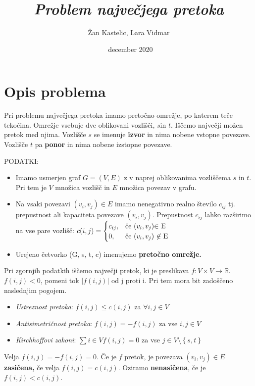 \documentclass[a4paper]{article}
\title{\textit{Problem največjega pretoka}}
\author{Žan Kastelic, Lara Vidmar}
\date{~december 2020}
\begin{document}
\begin{titlepage}
 \maketitle

\end{titlepage}

\section{Opis problema}
Pri problemu največjega pretoka imamo pretočno omrežje, po katerem teče tekočina. Omrežje vsebuje dve oblikovani vozlišči, $s $in $t$. Iščemo največji možen pretok med njima. Vozlišče $s$ se imenuje \textbf{izvor} in nima nobene vstopne povezave. Vozlišče $t$ pa \textbf{ponor} in nima nobene izstopne povezave.

PODATKI: 
\begin{itemize}
\item Imamo usmerjen graf $G = (V, E)$ z v naprej oblikovanima vozliščema $s $ in $t.$ Pri tem je $V$ množica vozlišč in $E$ množica povezav v grafu.
\item Na vsaki povezavi $(v_i, v_j) \in E$ imamo nenegativno realno število $c_{ij}$ tj. prepustnost ali kapaciteta povezave $(v_i, v_j).$ Prepustnost $c_{ij}$ lahko razširimo na vse pare vozlišč:  $c(i, j) = \begin{cases} c_{ij}, & \mbox{če }(v_i, v_j)\mbox{$ \in$ E} \\ 0, & \mbox{če }(v_i, v_j)\mbox{ $\not\in$ E} \end{cases}$
\item Urejeno četvorko (G, s, t, c) imenujemo \textbf{pretočno omrežje.}
\end{itemize}

Pri zgornjih podatkih iščemo največji pretok, ki je preslikava $f: V \times V \rightarrow \mathbb{R}.$ $f(i,j) < 0$, pomeni tok $|f(i,j)|$ od j proti i. Pri tem mora bit zadoščeno naslednjim pogojem. 
\begin{itemize}
\item \textit{Ustreznost pretoka}:  $f(i, j) \le c(i, j) $ za $\forall i, j \in V$
\item \textit{Antisimetričnost pretoka}: $f(i, j) = - f(i, j)$ za vse $i, j \in V$
\item \textit{Kirchhoffovi zakoni}: $\sum i \in V f(i, j) = 0 $ za vse $j \in V \setminus  \left \{ s, t \right \}$ 
\end{itemize}
Velja $f(i, j) = - f(i,j) = 0. $
Če je $f$ pretok, je povezava $(v_i, v_j) \in E$ \textbf{zasičena,} če velja $f(i,j) = c(i,j).$ Oziramo \textbf{nenasičena}, če je $f(i,j) < c(i,j).$ 
\end{document}
